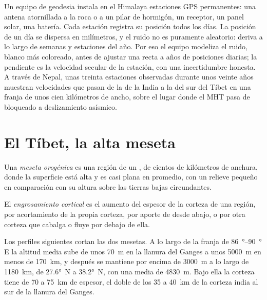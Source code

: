 \begin{inthefield}
Un equipo de geodesia instala en el Himalaya estaciones GPS permanentes: una antena atornillada a la roca
o a un pilar de hormigón, un receptor, un panel solar, una batería. Cada estación registra su
posición todos los días. La posición de un día se dispersa en milímetros, y el ruido no es puramente
aleatorio: deriva a lo largo de semanas y estaciones del año. Por eso el equipo modeliza el ruido, blanco más
coloreado, antes de ajustar una recta a años de posiciones diarias; la pendiente es la
velocidad secular de la estación, con una incertidumbre honesta. A través de Nepal, unas treinta estaciones
observadas durante unos veinte años muestran velocidades que pasan de la de la India a la del sur del Tíbet
en una franja de unos cien kilómetros de ancho, sobre el lugar donde el MHT pasa de bloqueado
a deslizamiento asísmico.
\end{inthefield}

\section{El Tíbet, la alta meseta}\label{sec:b2:himalaya-andes:tibet}

\begin{definition}\label{def:b2:himalaya-andes:plateau}
Una \emph{meseta orogénica} es una región de un , de cientos de
kilómetros de anchura, donde la superficie está alta y es casi plana en promedio, con un relieve
pequeño en comparación con su altura sobre las tierras bajas circundantes.
\end{definition}

\begin{definition}\label{def:b2:himalaya-andes:thickening}
El \emph{engrosamiento cortical} es el aumento del espesor de la
corteza de una región, por acortamiento de la propia corteza, por aporte de  desde abajo, o por
otra corteza que cabalga o fluye por debajo de ella.
\end{definition}

Los perfiles siguientes cortan las dos mesetas. A lo largo de la franja de \qtyrange{86}{90}{\degree} E la altitud
media sube de unos \qty{70}{m} en la llanura del Ganges a unos \qty{5000}{m} en menos
de \qty{170}{km}, y después se mantiene por encima de \qty{3000}{m} a lo largo de \qty{1180}{km}, de \ang{27.6}~N a
\ang{38.2}~N, con una media de \qty{4830}{m}. Bajo ella la corteza tiene de 70 a \qty{75}{km} de espesor,
el doble de los 35 a \qty{40}{km} de la corteza india al sur de la llanura del Ganges.

